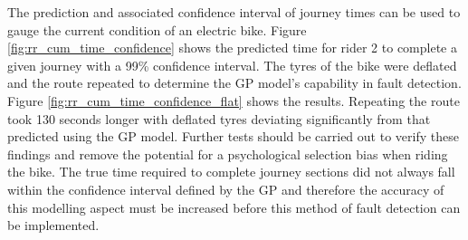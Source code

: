 \documentclass[a4paper, 10pt]{article}
\numberwithin{equation}{section}
\begin{document}
The prediction and associated confidence interval of journey times can be used to gauge the current condition of an electric bike. Figure \ref{fig:rr_cum_time_confidence} shows the predicted time for rider 2 to complete a given journey with a 99\% confidence interval. The tyres of the bike were deflated and the route repeated to determine the GP model's capability in fault detection. Figure \ref{fig:rr_cum_time_confidence_flat} shows the results. Repeating the route took 130 seconds longer with deflated tyres deviating significantly from that predicted using the GP model. Further tests should be carried out to verify these findings and remove the potential for a psychological selection bias when riding the bike. The true time required to complete journey sections did not always fall within the confidence interval defined by the GP and therefore the accuracy of this modelling aspect must be increased before this method of fault detection can be implemented. 
\end{document}
